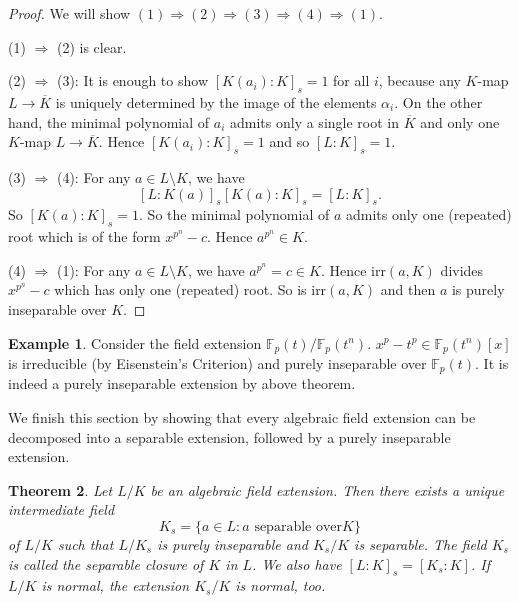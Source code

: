 \documentclass[12pt]{report}
\newtheorem{theorem}{Theorem}[section]
\theoremstyle{definition}
\newtheorem{example}[theorem]{Example}
\newcommand{\irr}{\text{irr}}
\newcommand{\FF}{\mathbb{F}}
\begin{document}
\begin{proof}
	We will show $(1)\Longrightarrow (2) \Longrightarrow (3) \Longrightarrow (4) \Longrightarrow (1)$.


	(1) $\Longrightarrow$ (2) is clear.


	(2) $\Longrightarrow$ (3):  It is enough to show $[K(a_i):K]_s=1$ for all $i$, because any $K$-map $L\to \overline{K}$ is uniquely determined by the image of the elements $\alpha_i$. On the other hand, the minimal polynomial of $a_i$ admits only a single root in $\overline{K}$ and only one $K$-map $L\to \overline{K}$. Hence $[K(a_i):K]_s=1$ and so $[L:K]_s=1$.


	(3) $\Longrightarrow$ (4): For any $a\in L\setminus K$, we have $$[L:K(a)]_s [K(a):K]_s = [L:K]_s.$$ So $[K(a):K]_s=1$. So the minimal polynomial of $a$ admits only one (repeated) root which is of the form $x^{p^n}-c$. Hence $a^{p^n}\in K$.


	(4) $\Longrightarrow$ (1):  For any $a\in L\setminus K$, we have $a^{p^n}=c\in K$. Hence $\irr(a,K)$ divides $x^{p^n}-c$ which has only one (repeated) root. So is $\irr(a,K)$ and then $a$ is purely inseparable over $K$.
\end{proof}

\begin{example}
	Consider the field extension $\FF_p(t)/\FF_p(t^n)$. $x^p-t^p\in \FF_p(t^n)[x]$ is irreducible (by Eisenstein's Criterion) and purely inseparable over $\FF_p(t)$. It is indeed a purely inseparable extension by above theorem.
\end{example}

We finish this section by showing that every algebraic field extension can be decomposed into a separable extension, followed by a purely inseparable extension.

\begin{theorem}
	Let $L/K$ be an algebraic field extension. Then there exists a unique intermediate field $$K_s=\{a\in L:a \mbox{ separable over} K\}$$ of $L/K$ such that $L/K_s$ is purely inseparable and $K_s/K$ is separable. The field $K_s$ is called the separable closure of $K$ in $L$. We also have  $[L : K]_s = [K_s : K]$. If $L/K$ is normal, the extension $K_s/K$ is normal, too.
\end{theorem}
\end{document}
